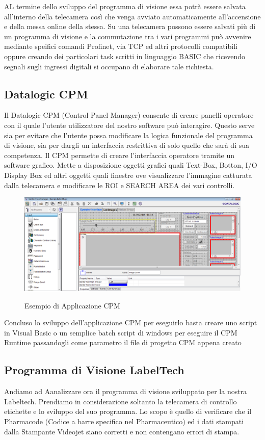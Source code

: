 \documentclass[12pt, a4paper, oneside]{book}
\begin{document}
AL termine dello sviluppo del programma di visione essa potrà essere salvata all'interno della telecamera così che venga avviato automaticamente all'accensione e della messa online della stessa. Su una telecamera possono essere salvati più di un programma di visione e la commutazione tra i vari programmi può avvenire mediante speifici comandi Profinet, via TCP ed altri protocolli compatibili oppure creando dei particolari task scritti in linguaggio BASIC che ricevendo segnali sugli ingressi digitali si occupano di elaborare tale richiesta.

\subsection{Datalogic CPM}

Il Datalogic CPM (Control Panel Manager) consente di creare panelli operatore con il quale l'utente utilizzatore del nostro software può interagire. Questo serve sia per evitare che l'utente possa modificare la logica funzionale del programma di visione, sia per dargli un interfaccia restrittiva di solo quello che sarà di sua competenza. Il CPM permette di creare l'interfaccia operatore tramite un software grafico. Mette a disposizione oggetti grafici quali Text-Box, Botton, I/O Display Box ed altri oggetti quali finestre ove visualizzare l'immagine catturata dalla telecamera e modificare le ROI e SEARCH AREA dei vari controlli.

			\begin{figure}[H]
	\centering
	\includegraphics[width=13cm]{Immagini/VIS6}
	\label{vis6}
	\caption{Esempio di Applicazione CPM}
\end{figure}

Concluso lo sviluppo dell'applicazione CPM per eseguirlo basta creare uno script in Visual Basic o un semplice batch script di windows per eseguire il CPM Runtime passandogli come parametro il file di progetto CPM appena creato

\subsection{Programma di Visione LabelTech}
Andiamo ad Aanalizzare ora il programma di visione sviluppato per la nostra Labeltech. Prendiamo in considerazione soltanto la telecamera di controllo etichette e lo sviluppo del suo programma. Lo scopo è quello di verificare che il Pharmacode (Codice a barre specifico nel Pharmaceutico) ed i dati stampati dalla Stampante Videojet siano corretti e non contengano errori di stampa. 
\end{document}
